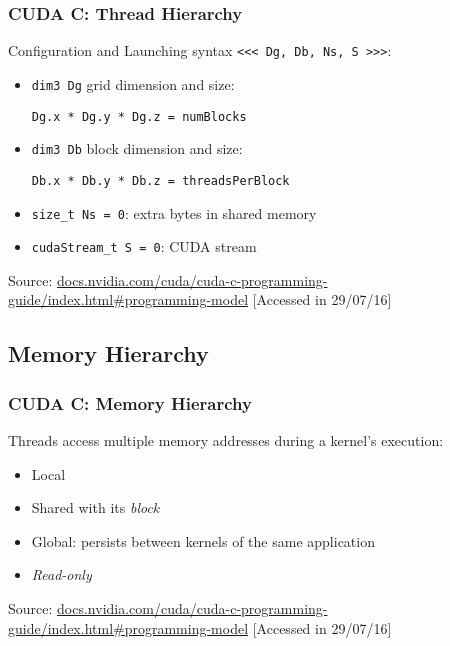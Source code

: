 \documentclass[10pt, compress]{beamer}
\begin{document}
\begin{frame}[fragile]
    \frametitle{CUDA C: Thread Hierarchy}
    Configuration and Launching syntax \texttt{\scriptsize{\alert{<<<} Dg, Db, Ns, S \alert{>>>}}}:
    \begin{itemize}
        \item \texttt{\alert{dim3} Dg} grid dimension and size:
\begin{lstlisting}
Dg.x * Dg.y * Dg.z = numBlocks
\end{lstlisting}

        \item \texttt{\alert{dim3} Db} block dimension and size:
\begin{lstlisting}
Db.x * Db.y * Db.z = threadsPerBlock
\end{lstlisting}

        \item \texttt{\alert{size\_t} Ns = 0}: extra bytes in shared memory
        \item \texttt{\alert{cudaStream\_t} S = 0}: CUDA stream
    \end{itemize}

    \vfill

    \begin{center}
        \tiny{Source: \url{docs.nvidia.com/cuda/cuda-c-programming-guide/index.html\#programming-model} [Accessed in 29/07/16]}
    \end{center}
\end{frame}

\subsection{Memory Hierarchy}

\begin{frame}
    \frametitle{CUDA C: Memory Hierarchy}
    Threads access \alert{multiple memory addresses} during a kernel's execution:
    \begin{itemize}
        \item Local

        \item Shared with its \textit{block}

        \item Global: persists between kernels of the \alert{same application}

        \item \textit{Read-only}
    \end{itemize}
    \vfill

    \begin{center}
        \tiny{Source: \url{docs.nvidia.com/cuda/cuda-c-programming-guide/index.html\#programming-model} [Accessed in 29/07/16]}
    \end{center}
\end{frame}
\end{document}
